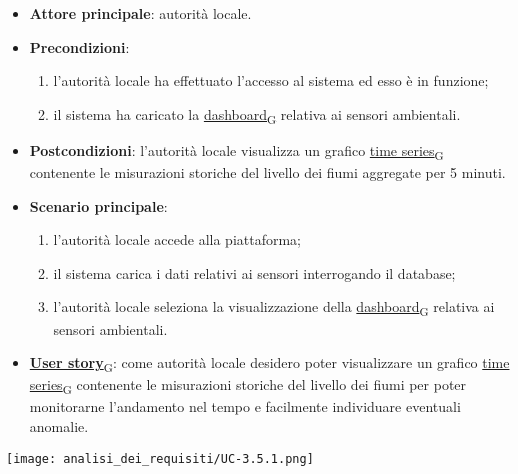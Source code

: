 \begin{itemize}
	\item \textbf{Attore principale}: autorità locale.
	\item \textbf{Precondizioni}:
	      \begin{enumerate}
		      \item l'autorità locale ha effettuato l'accesso al sistema ed esso è in funzione;
		      \item il sistema ha caricato la \href{https://7last.github.io/docs/pb/documentazione-interna/glossario\#dashboard}{dashboard\textsubscript{G}} relativa ai sensori ambientali.
	      \end{enumerate}
	\item \textbf{Postcondizioni}: l'autorità locale visualizza un grafico \href{https://7last.github.io/docs/pb/documentazione-interna/glossario\#time-series}{time series\textsubscript{G}} contenente le misurazioni storiche
	      del livello dei fiumi aggregate per 5 minuti.
	\item \textbf{Scenario principale}:
	      \begin{enumerate}
		      \item l'autorità locale accede alla piattaforma;
		      \item il sistema carica i dati relativi ai sensori interrogando il database;
		      \item l'autorità locale seleziona la visualizzazione della \href{https://7last.github.io/docs/pb/documentazione-interna/glossario\#dashboard}{dashboard\textsubscript{G}} relativa ai sensori ambientali.
	      \end{enumerate}
	\item \href{https://7last.github.io/docs/pb/documentazione-interna/glossario\#user-story}{\textbf{User story}\textsubscript{G}}:
	      come autorità locale desidero poter visualizzare un grafico \href{https://7last.github.io/docs/pb/documentazione-interna/glossario\#time-series}{time series\textsubscript{G}} contenente le misurazioni storiche
	      del livello dei fiumi per poter monitorarne l'andamento nel tempo e facilmente individuare eventuali anomalie.
\end{itemize}
\begin{center}
	\texttt{[image: analisi\_dei\_requisiti/UC-3.5.1.png]}
\end{center}



